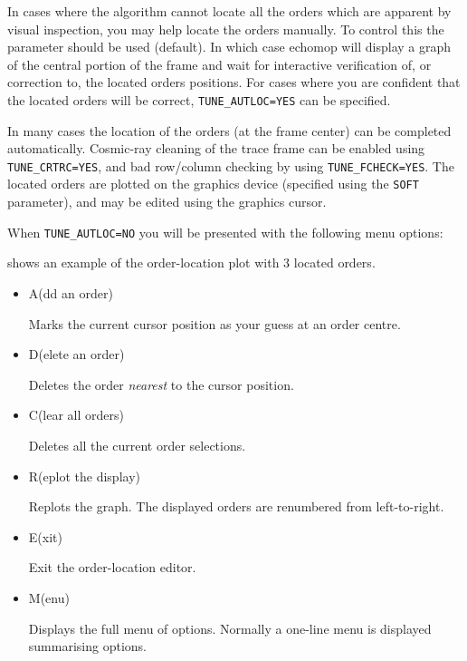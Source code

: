 \begin{itemize}
In cases where the algorithm cannot locate all the orders which are
apparent by visual inspection, you may help locate the orders
manually.  To control this the parameter
should be used (default). In which case {\sc echomop} will display a graph
of the central portion of the frame and wait for interactive
verification of, or correction to, the located orders positions. For
cases where you are confident that the located orders will be
correct, \verb+TUNE_AUTLOC=YES+ can be specified.

In many cases the location of the orders (at the frame center) can be
completed automatically. Cosmic-ray cleaning of the trace frame can
be enabled using \verb+TUNE_CRTRC=YES+, and bad row/column checking
by using \verb+TUNE_FCHECK=YES+\@.
The located orders are plotted on the graphics device (specified
using the \verb+SOFT+ parameter), and may be edited using the graphics
cursor.

When {\tt TUNE\_AUTLOC=NO} you will be presented with the following menu
options:

shows an example of the order-location plot with 3 located orders.

\begin{itemize}

\item {\sunspec{\Large\tt}{\bf} A}(dd an order)

      Marks the current cursor position as your guess at an order centre.

\item {\sunspec{\Large\tt}{\bf} D}(elete an order)

      Deletes the order {\em nearest} to the cursor position.


\item {\sunspec{\Large\tt}{\bf} C}(lear all orders)

      Deletes all the current order selections.

\item {\sunspec{\Large\tt}{\bf} R}(eplot the display)

      Replots the graph.
      The displayed orders are renumbered from left-to-right.

\item {\sunspec{\Large\tt}{\bf} E}(xit)

      Exit the order-location editor.

\item {\sunspec{\Large\tt}{\bf} M}(enu)

      Displays the full menu of options.
      Normally a one-line menu is displayed summarising options.

\end{itemize}
\end{itemize}


